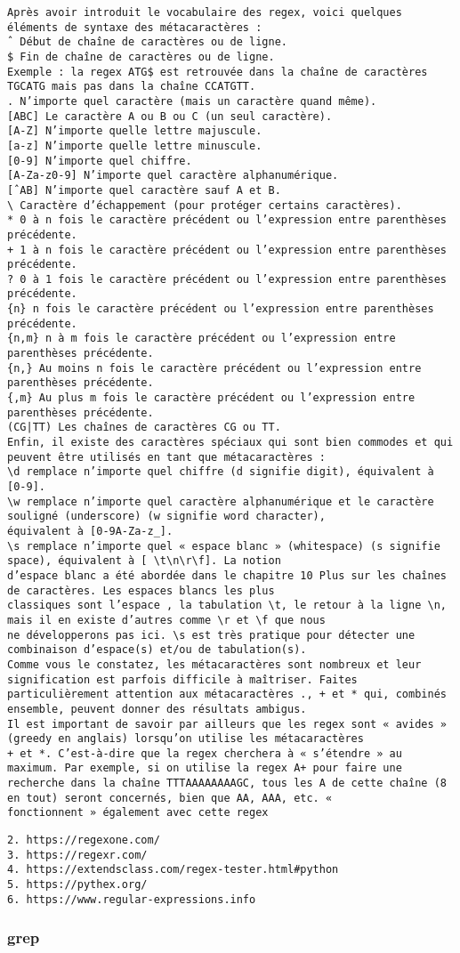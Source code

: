 \begin{verbatim}
Après avoir introduit le vocabulaire des regex, voici quelques éléments de syntaxe des métacaractères :
ˆ Début de chaîne de caractères ou de ligne.
$ Fin de chaîne de caractères ou de ligne.
Exemple : la regex ATG$ est retrouvée dans la chaîne de caractères TGCATG mais pas dans la chaîne CCATGTT.
. N’importe quel caractère (mais un caractère quand même).
[ABC] Le caractère A ou B ou C (un seul caractère).
[A-Z] N’importe quelle lettre majuscule.
[a-z] N’importe quelle lettre minuscule.
[0-9] N’importe quel chiffre.
[A-Za-z0-9] N’importe quel caractère alphanumérique.
[ˆAB] N’importe quel caractère sauf A et B.
\ Caractère d’échappement (pour protéger certains caractères).
* 0 à n fois le caractère précédent ou l’expression entre parenthèses précédente.
+ 1 à n fois le caractère précédent ou l’expression entre parenthèses précédente.
? 0 à 1 fois le caractère précédent ou l’expression entre parenthèses précédente.
{n} n fois le caractère précédent ou l’expression entre parenthèses précédente.
{n,m} n à m fois le caractère précédent ou l’expression entre parenthèses précédente.
{n,} Au moins n fois le caractère précédent ou l’expression entre parenthèses précédente.
{,m} Au plus m fois le caractère précédent ou l’expression entre parenthèses précédente.
(CG|TT) Les chaînes de caractères CG ou TT.
Enfin, il existe des caractères spéciaux qui sont bien commodes et qui peuvent être utilisés en tant que métacaractères :
\d remplace n’importe quel chiffre (d signifie digit), équivalent à [0-9].
\w remplace n’importe quel caractère alphanumérique et le caractère souligné (underscore) (w signifie word character),
équivalent à [0-9A-Za-z_].
\s remplace n’importe quel « espace blanc » (whitespace) (s signifie space), équivalent à [ \t\n\r\f]. La notion
d’espace blanc a été abordée dans le chapitre 10 Plus sur les chaînes de caractères. Les espaces blancs les plus
classiques sont l’espace , la tabulation \t, le retour à la ligne \n, mais il en existe d’autres comme \r et \f que nous
ne développerons pas ici. \s est très pratique pour détecter une combinaison d’espace(s) et/ou de tabulation(s).
Comme vous le constatez, les métacaractères sont nombreux et leur signification est parfois difficile à maîtriser. Faites
particulièrement attention aux métacaractères ., + et * qui, combinés ensemble, peuvent donner des résultats ambigus.
Il est important de savoir par ailleurs que les regex sont « avides » (greedy en anglais) lorsqu’on utilise les métacaractères
+ et *. C’est-à-dire que la regex cherchera à « s’étendre » au maximum. Par exemple, si on utilise la regex A+ pour faire une
recherche dans la chaîne TTTAAAAAAAAGC, tous les A de cette chaîne (8 en tout) seront concernés, bien que AA, AAA, etc. «
fonctionnent » également avec cette regex
\end{verbatim}
\begin{verbatim}
2. https://regexone.com/
3. https://regexr.com/
4. https://extendsclass.com/regex-tester.html#python
5. https://pythex.org/
6. https://www.regular-expressions.info
\end{verbatim}




\subsubsection{grep}

